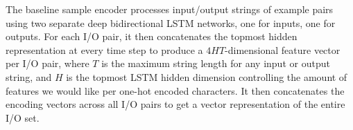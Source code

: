 \documentclass{article} %
\begin{document}
The baseline sample encoder processes input/output strings of example pairs
using two separate deep bidirectional LSTM networks,
one for inputs, one for outputs.
For each I/O pair, it then concatenates the topmost hidden representation
at every time step to produce a $4HT$-dimensional feature vector per I/O pair,
where $T$ is the maximum string length for any input or output string,
and $H$ is the topmost LSTM hidden dimension controlling the amount
of features we would like per one-hot encoded characters.
It then concatenates the encoding vectors across all I/O pairs
to get a vector representation of the entire I/O set.~\citep{nsps}

\end{document}
